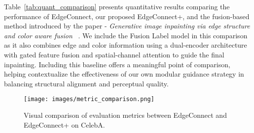 Table~\ref{tab:quant_comparison} presents quantitative results comparing the performance of EdgeConnect, our proposed EdgeConnect+, and the fusion-based method introduced by the paper - \textit{Generative image inpainting via edge structure and color aware fusion} ~\cite{shao2021generative}. We include the Fusion Label model in this comparison as it also combines edge and color information using a dual-encoder architecture with gated feature fusion and spatial-channel attention to guide the final inpainting. Including this baseline offers a meaningful point of comparison, helping contextualize the effectiveness of our own modular guidance strategy in balancing structural alignment and perceptual quality.


\begin{figure}[h]
    \centering
    \texttt{[image: images/metric\_comparison.png]}
    \caption{Visual comparison of evaluation metrics between EdgeConnect and EdgeConnect+ on CelebA.}
    \label{fig:metric_comparison}
\end{figure}